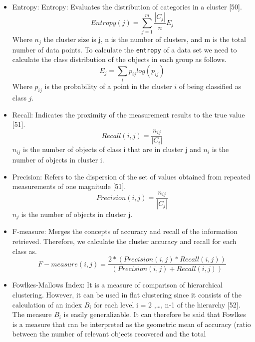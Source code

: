 \documentclass[
]{article}
\begin{document}
\begin{itemize}
\item
  Entropy: Entropy: Evaluates the distribution of categories in a
  cluster {[}50{]}. \begin{equation}
        Entropy(j) =  \sum_{j=1}^{m} \frac{|C_{j}|}{n}E_{j}
    \end{equation} Where \(n_{j}\) the cluster size is j, n is the
  number of clusters, and m is the total number of data points. To
  calculate the \texttt{entropy} of a data set we need to calculate the
  class distribution of the objects in each group as follows.
  \begin{equation}
        E_{j} =  \sum_{i} p_{ij}log(p_{ij})
    \end{equation} Where \(p_{ij}\) is the probability of a point in the
  cluster \(i\) of being classified as class \(j\).
\item
  Recall: Indicates the proximity of the measurement results to the true
  value {[}51{]}. \begin{equation}
         Recall(i,j) = \frac{n_{ij}}{|C_{i}|}
    \end{equation} \(n_{ij}\) is the number of objects of class i that
  are in cluster j and \(n_{i}\) is the number of objects in cluster i.
\item
  Precision: Refers to the dispersion of the set of values obtained from
  repeated measurements of one magnitude {[}51{]}. \begin{equation}
            Precision(i,j) = \frac{n_{ij}}{|C_{j}|}
        \end{equation} \(n_{j}\) is the number of objects in cluster j.
\item
  F-measure: Merges the concepts of accuracy and recall of the
  information retrieved. Therefore, we calculate the cluster accuracy
  and recall for each class as. \begin{equation}
        F-measure(i,j) = \frac{2 * (Precision(i,j) * Recall(i,j))}{(Precision(i,j) + Recall(i,j))}
    \end{equation}
\item
  Fowlkes-Mallows Index: It is a measure of comparison of hierarchical
  clustering. However, it can be used in flat clustering since it
  consists of the calculation of an index \(B_{i}\) for each level i = 2
  ,\ldots, n-1 of the hierarchy {[}52{]}. The measure \(B_{i}\) is
  easily generalizable. It can therefore be said that Fowlkes is a
  measure that can be interpreted as the geometric mean of accuracy
  (ratio between the number of relevant objects recovered and the total

\end{itemize}
\end{document}
